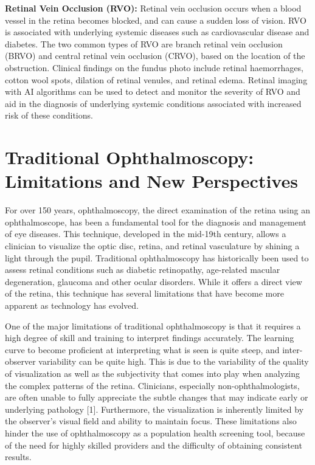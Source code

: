 \documentclass[
  Letterpaper,
]{scrbook}
\begin{document}
\textbf{Retinal Vein Occlusion (RVO):} Retinal vein occlusion occurs
when a blood vessel in the retina becomes blocked, and can cause a
sudden loss of vision. RVO is associated with underlying systemic
diseases such as cardiovascular disease and diabetes. The two common
types of RVO are branch retinal vein occlusion (BRVO) and central
retinal vein occlusion (CRVO), based on the location of the obstruction.
Clinical findings on the fundus photo include retinal haemorrhages,
cotton wool spots, dilation of retinal venules, and retinal edema.
Retinal imaging with AI algorithms can be used to detect and monitor the
severity of RVO and aid in the diagnosis of underlying systemic
conditions associated with increased risk of these conditions.

\section{Traditional Ophthalmoscopy: Limitations and New
Perspectives}\label{traditional-ophthalmoscopy-limitations-and-new-perspectives}

For over 150 years, ophthalmoscopy, the direct examination of the retina
using an ophthalmoscope, has been a fundamental tool for the diagnosis
and management of eye diseases. This technique, developed in the
mid-19th century, allows a clinician to visualize the optic disc,
retina, and retinal vasculature by shining a light through the pupil.
Traditional ophthalmoscopy has historically been used to assess retinal
conditions such as diabetic retinopathy, age-related macular
degeneration, glaucoma and other ocular disorders. While it offers a
direct view of the retina, this technique has several limitations that
have become more apparent as technology has evolved.

One of the major limitations of traditional ophthalmoscopy is that it
requires a high degree of skill and training to interpret findings
accurately. The learning curve to become proficient at interpreting what
is seen is quite steep, and inter-observer variability can be quite
high. This is due to the variability of the quality of visualization as
well as the subjectivity that comes into play when analyzing the complex
patterns of the retina. Clinicians, especially non-ophthalmologists, are
often unable to fully appreciate the subtle changes that may indicate
early or underlying pathology {[}1{]}. Furthermore, the visualization is
inherently limited by the observer's visual field and ability to
maintain focus. These limitations also hinder the use of ophthalmoscopy
as a population health screening tool, because of the need for highly
skilled providers and the difficulty of obtaining consistent results.
\end{document}
